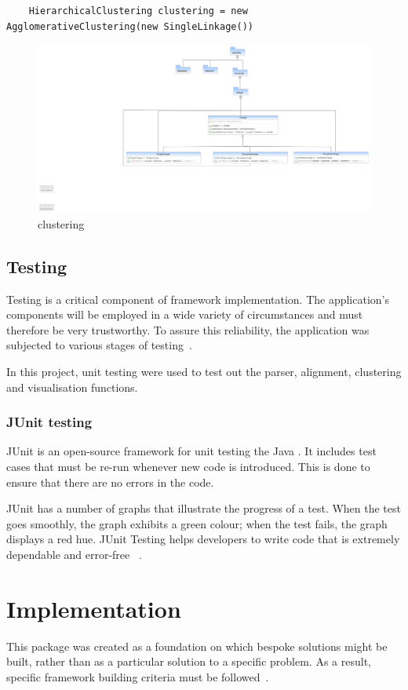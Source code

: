 \documentclass[]{final_report}
\begin{document}
\begin{verbatim}
    HierarchicalClustering clustering = new AgglomerativeClustering(new SingleLinkage())
\end{verbatim}

\begin{figure}[H]
    \centering
    \includegraphics[width=1\textwidth]{linkage.umlcd.png}
    \caption{clustering}
    \label{fig:linkage_class_diagram}
\end{figure}
\section{Testing}
Testing is a critical component of framework implementation. The application's components will be employed in a wide variety of circumstances and must therefore be very trustworthy. To assure this reliability, the application was subjected to various stages of testing~\cite{gewehr2007bioweka}.

In this project, unit testing were used to test out the parser, alignment, clustering and visualisation functions. 
\subsection{JUnit testing}
JUnit is an open-source framework for unit testing the Java . It includes test cases that must be re-run whenever new code is introduced. This is done to ensure that there are no errors in the code.

JUnit has a number of graphs that illustrate the progress of a test. When the test goes smoothly, the graph exhibits a green colour; when the test fails, the graph displays a red hue. JUnit Testing helps developers to write code that is extremely dependable and error-free ~\cite{appel2015testing}.

\chapter{Implementation}
This package was created as a foundation on which bespoke solutions might be built, rather than as a particular solution to a specific problem. As a result, specific framework building criteria must be followed~\cite{gewehr2007bioweka}.
\end{document}

